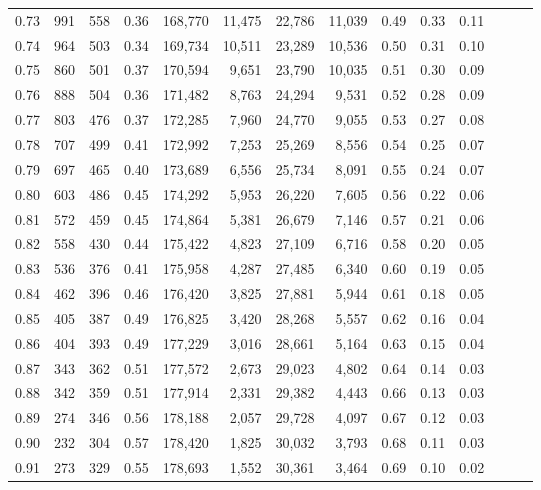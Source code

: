 \begin{tabular}{rrrrrrrrrrrrrr}
0.73 &    991 &    558 &  0.36 &  168,770 &   11,475 &  22,786 &  11,039 &  0.49 &  0.33 &      0.11 \\
0.74 &    964 &    503 &  0.34 &  169,734 &   10,511 &  23,289 &  10,536 &  0.50 &  0.31 &      0.10 \\
0.75 &    860 &    501 &  0.37 &  170,594 &    9,651 &  23,790 &  10,035 &  0.51 &  0.30 &      0.09 \\
0.76 &    888 &    504 &  0.36 &  171,482 &    8,763 &  24,294 &   9,531 &  0.52 &  0.28 &      0.09 \\
0.77 &    803 &    476 &  0.37 &  172,285 &    7,960 &  24,770 &   9,055 &  0.53 &  0.27 &      0.08 \\
0.78 &    707 &    499 &  0.41 &  172,992 &    7,253 &  25,269 &   8,556 &  0.54 &  0.25 &      0.07 \\
0.79 &    697 &    465 &  0.40 &  173,689 &    6,556 &  25,734 &   8,091 &  0.55 &  0.24 &      0.07 \\
0.80 &    603 &    486 &  0.45 &  174,292 &    5,953 &  26,220 &   7,605 &  0.56 &  0.22 &      0.06 \\
0.81 &    572 &    459 &  0.45 &  174,864 &    5,381 &  26,679 &   7,146 &  0.57 &  0.21 &      0.06 \\
0.82 &    558 &    430 &  0.44 &  175,422 &    4,823 &  27,109 &   6,716 &  0.58 &  0.20 &      0.05 \\
0.83 &    536 &    376 &  0.41 &  175,958 &    4,287 &  27,485 &   6,340 &  0.60 &  0.19 &      0.05 \\
0.84 &    462 &    396 &  0.46 &  176,420 &    3,825 &  27,881 &   5,944 &  0.61 &  0.18 &      0.05 \\
0.85 &    405 &    387 &  0.49 &  176,825 &    3,420 &  28,268 &   5,557 &  0.62 &  0.16 &      0.04 \\
0.86 &    404 &    393 &  0.49 &  177,229 &    3,016 &  28,661 &   5,164 &  0.63 &  0.15 &      0.04 \\
0.87 &    343 &    362 &  0.51 &  177,572 &    2,673 &  29,023 &   4,802 &  0.64 &  0.14 &      0.03 \\
0.88 &    342 &    359 &  0.51 &  177,914 &    2,331 &  29,382 &   4,443 &  0.66 &  0.13 &      0.03 \\
0.89 &    274 &    346 &  0.56 &  178,188 &    2,057 &  29,728 &   4,097 &  0.67 &  0.12 &      0.03 \\
0.90 &    232 &    304 &  0.57 &  178,420 &    1,825 &  30,032 &   3,793 &  0.68 &  0.11 &      0.03 \\
0.91 &    273 &    329 &  0.55 &  178,693 &    1,552 &  30,361 &   3,464 &  0.69 &  0.10 &      0.02 \\

\end{tabular}
